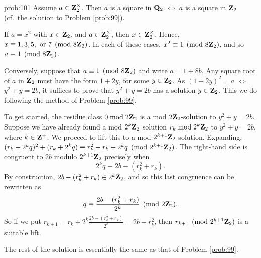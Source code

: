 \begin{sol}{prob:101} Assume $a \in \mathbf{Z}_2^{\times}$. Then $a$ is a square in $\mathbf{Q}_2$ $\Longleftrightarrow$ $a$ is a square in $\mathbf{Z}_2$ (cf.\ the solution to Problem \ref{prob:99}). 

If $a=x^2$ with $x\in \mathbf{Z}_2$, and $a\in \mathbf{Z}_2^{\times}$, then $x\in \mathbf{Z}_2^{\times}$. Hence, $x\equiv 1,3,5,\text{ or }7\pmod{8\mathbf{Z}_2}$. In each of these cases, $x^2\equiv 1\pmod{8\mathbf{Z}_2}$, and so $a\equiv 1\pmod{8\mathbf{Z}_2}$.

Conversely, suppose that $a\equiv 1\pmod{8\mathbf{Z}_2}$ and write $a=1+8b$. Any square root of $a$ in $\mathbf{Z}_2$ must have the form $1+2y$, for some $y \in \mathbf{Z}_2$. As $(1+2y)^2= a$ $\Longleftrightarrow$ $y^2+y=2b$, it suffices to prove that $y^2+y=2b$ has a solution $y\in \mathbf{Z}_2$. This we do following the method of Problem \ref{prob:99}.

To get started, the residue class $0\bmod{2\mathbf{Z}_2}$ is a mod $2\mathbf{Z}_2$-solution to $y^2+y=2b$. Suppose we have already found a mod $2^k \mathbf{Z}_2$ solution $r_k\bmod{2^k \mathbf{Z}_2}$ to $y^2+y=2b$, where $k \in \mathbf{Z}^{+}$. We proceed to lift this to a mod $2^{k+1}\mathbf{Z}_2$ solution. Expanding, $(r_k+2^{k}q)^2 + (r_k + 2^k q) \equiv r_k^2 + r_k + 2^k q \pmod{2^{k+1}\mathbf{Z}_2}$. The right-hand side is congruent to $2b$ modulo $2^{k+1}\mathbf{Z}_2$ precisely when 
\[ 2^k q \equiv 2b - (r_k^2 + r_k). \]
By construction, $2b-(r_k^2+r_k) \in 2^k \mathbf{Z}_2$, and so this last congruence can be rewritten as
\[ q\equiv \frac{2b-(r_k^2+r_k)}{2^k}\pmod{2\mathbf{Z}_2}. \]
So if we put $r_{k+1} = r_k + 2^k\frac{2b-(r_k^2+r_k)}{2^k} = 2b-r_k^2$, then $r_{k+1}\pmod{2^{k+1}\mathbf{Z}_2}$ is a suitable lift. 

    The rest of the solution is essentially the same as that of Problem \ref{prob:99}.




\end{sol}
